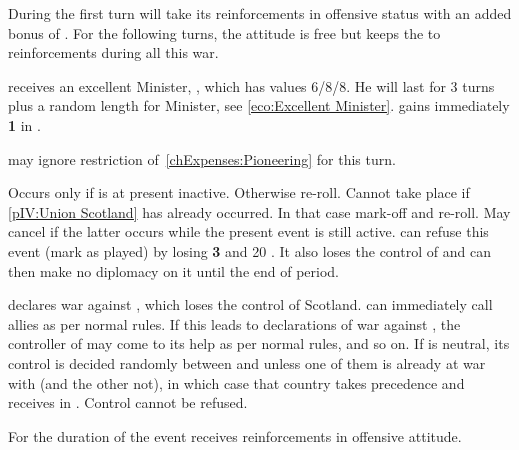 \phadm
\aparag During the first turn \paysDanemark will take its reinforcements in
offensive status with an added bonus of . For the following turns,
the attitude is free but \paysDanemark keeps the  to reinforcements
during all this war.





\phevnt
\aparag \SUE receives an excellent Minister, , which has
values 6/8/8. He will last for 3 turns plus a random length for Minister, see
\ref{eco:Excellent Minister}.
\aparag \SUE gains immediately {\bf 1} in \STAB.

\phadm
\aparag \SUE may ignore restriction of~\ref{chExpenses:Pioneering} for this
turn.





\condition{}
\aparag Occurs only if \paysecosse is at present inactive. Otherwise re-roll.
\aparag Cannot take place if \ref{pIV:Union Scotland} has already occurred.
In that case mark-off and re-roll. May cancel  if
the latter occurs while the present event is still active.
\aparag \ENG can refuse this event (mark as played) by losing {\bf 3} \STAB
and 20 \VP.  It also loses the control of \paysecosse and can then make no
diplomacy on it until the end of period.

\phevnt
\aparag \paysecosse declares war against \ENG, which loses the control of
Scotland.
\aparag \ENG can immediately call allies as per normal rules.
\aparag If this leads to declarations of war against \paysecosse, the
controller of \paysecosse may come to its help as per normal rules, and so on.
\aparag If \paysecosse is neutral, its control is decided randomly between
\SPA and \FRA unless one of them is already at war with \ENG (and the other
not), in which case that country takes precedence and receives \paysecosse in
\EG. Control cannot be refused.

\phadm
\aparag For the duration of the event \paysecosse receives reinforcements in
offensive attitude.




